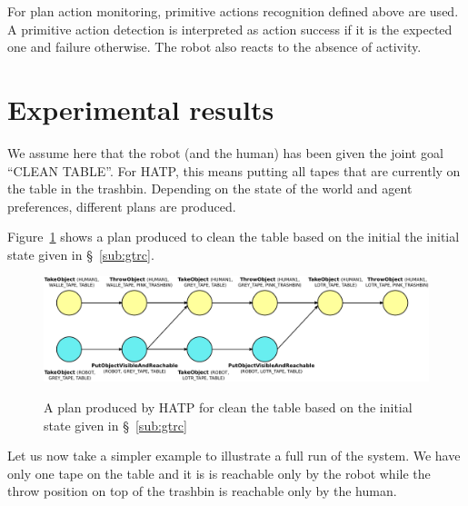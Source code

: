 \documentclass[preprint,12pt]{elsarticle}
\begin{document}
For plan action monitoring, primitive actions recognition defined
above are used. A primitive action detection is interpreted as action
success if it is the expected one and failure otherwise. The robot
also reacts to the absence of activity.










\section{Experimental results}

We assume here that the robot (and the human) has been given the joint goal
``CLEAN TABLE''. For HATP, this means putting all tapes that are
currently on the table in the trashbin. Depending on the state of the
world and agent preferences, different plans are produced.

Figure~\ref{plan-etat2} shows a plan produced to clean the table based on the initial the initial state given in  \S~\ref{sub:gtrc}.

\begin{figure}[thpb]
  \centering
  \includegraphics[width=1.0\textwidth]{./figs/plan3.pdf} \\
  \caption {A plan produced by HATP for clean the table based on the initial state given in \S~\ref{sub:gtrc}}
  \label{plan-etat2}
\end{figure}

Let us now take a simpler example to illustrate a full run of the
system. We have only one tape on the table and it is is reachable only
by the robot while the throw position on top of the trashbin is
reachable only by the human.
\end{document}
